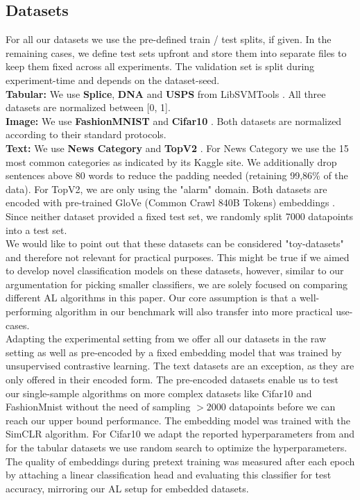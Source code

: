 \documentclass[]{article}
\begin{document}
\subsection{Datasets}\label{sec:datasets}
For all our datasets we use the pre-defined train / test splits, if given. 
In the remaining cases, we define test sets upfront and store them into separate files to keep them fixed across all experiments.
The validation set is split during experiment-time and depends on the dataset-seed.\\
\textbf{Tabular:}
We use \textbf{Splice}, \textbf{DNA} and \textbf{USPS} from LibSVMTools \cite{libsvmtools}.
All three datasets are normalized between [0, 1]. \\
\textbf{Image:}
We use \textbf{FashionMNIST} \cite{xiao2017fashion} and \textbf{Cifar10} \cite{krizhevsky2009learning}.
Both datasets are normalized according to their standard protocols. \\
\textbf{Text:}
We use \textbf{News Category} \cite{misra2022news} and \textbf{TopV2} \cite{chen-etal-2020-low-resource}.
For News Category we use  the 15 most common categories as indicated by its Kaggle site.
We additionally drop sentences above 80 words to reduce the padding needed (retaining 99,86\% of the data).
For TopV2, we are only using the "alarm" domain.
Both datasets are encoded with pre-trained GloVe (Common Crawl 840B Tokens) embeddings \cite{pennington2014glove}.
Since neither dataset provided a fixed test set, we randomly split 7000 datapoints into a test set. \\ [1mm]
%
We would like to point out that these datasets can be considered "toy-datasets" and therefore not relevant for practical purposes.
This might be true if we aimed to develop novel classification models on these datasets, however, similar to our argumentation for picking smaller classifiers, we are solely focused on comparing different AL algorithms in this paper.
Our core assumption is that a well-performing algorithm in our benchmark will also transfer into more practical use-cases. \\ [1mm]
Adapting the experimental setting from \cite{hacohen2022active} we offer all our datasets in the raw setting as well as pre-encoded by a fixed embedding model that was trained by unsupervised contrastive learning. 
The text datasets are an exception, as they are only offered in their encoded form.
The pre-encoded datasets enable us to test our single-sample algorithms on more complex datasets like Cifar10 and FashionMnist without the need of sampling $>2000$ datapoints before we can reach our upper bound performance.
The embedding model was trained with the SimCLR \cite{chen2020simple} algorithm. 
For Cifar10 we adapt the reported hyperparameters from \cite{hacohen2022active} and for the tabular datasets we use random search to optimize the hyperparameters.
The quality of embeddings during pretext training was measured after each epoch by attaching a linear classification head and evaluating this classifier for test accuracy, mirroring our AL setup for embedded datasets.
\end{document}
